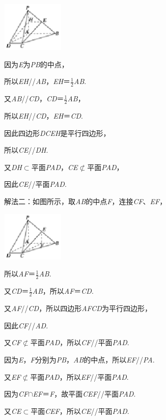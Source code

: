 \documentclass{article} %
\begin{document}
\includegraphics*[width=1.17in, height=0.94in, keepaspectratio=false]{image180}

因为\textit{E}为\textit{PB}的中点，

所以\textit{EH}//\textit{AB}，\textit{EH}＝$\frac{1}{2}$\textit{AB}.

又\textit{AB}//\textit{CD}，\textit{CD}＝$\frac{1}{2}$\textit{AB}，

所以\textit{EH}//\textit{CD}，\textit{EH}＝\textit{CD}.

因此四边形\textit{DCEH}是平行四边形，

所以\textit{CE}//\textit{DH}.

又\textit{DH}$\mathrm{\subset }$平面\textit{PAD}，\textit{CE}$\mathrm{\nsubset}$平面\textit{PAD}，

因此\textit{CE}//平面\textit{PAD}.

解法二：如图所示，取\textit{AB}的中点\textit{F}，连接\textit{CF}、\textit{EF}，

\includegraphics*[width=1.17in, height=0.94in, keepaspectratio=false]{image181}

所以\textit{AF}＝$\frac{1}{2}$\textit{AB}.

又\textit{CD}＝$\frac{1}{2}$\textit{AB}，所以\textit{AF}＝\textit{CD}.

又\textit{AF}//\textit{CD}，所以四边形\textit{AFCD}为平行四边形，

因此\textit{CF}//\textit{AD}.

又\textit{CF}$\mathrm{\nsubset}$平面\textit{PAD}，所以\textit{CF}//平面\textit{PAD}.

因为\textit{E}，\textit{F}分别为\textit{PB}，\textit{AB}的中点，所以\textit{EF}//\textit{PA}.

又\textit{EF}$\mathrm{\nsubset}$平面\textit{PAD}，所以\textit{EF}//平面\textit{PAD}.

因为\textit{CF}$\mathrm{\cap}$\textit{EF}＝\textit{F}，故平面\textit{CEF}//平面\textit{PAD}.

又\textit{CE}$\mathrm{\subset }$平面\textit{CEF}，所以\textit{CE}//平面\textit{PAD}.
\end{document}
